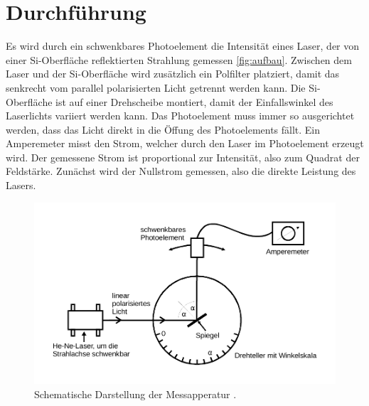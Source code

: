 \section{Durchführung}
\label{sec:Durchführung}

Es wird durch ein schwenkbares Photoelement die Intensität eines Laser, der von einer Si-Oberfläche reflektierten Strahlung gemessen \autoref{fig:aufbau}.
Zwischen dem Laser und der Si-Oberfläche wird zusätzlich ein Polfilter platziert, damit das senkrecht vom parallel polarisierten Licht getrennt werden kann.
Die Si-Oberfläche ist auf einer Drehscheibe montiert, damit der Einfallswinkel des Laserlichts variiert werden kann. Das Photoelement muss immer so ausgerichtet werden, dass das Licht direkt in die Öffung des Photoelements fällt.
Ein Amperemeter misst den Strom, welcher durch den Laser im Photoelement erzeugt wird. Der gemessene Strom ist proportional zur Intensität, also zum Quadrat der Feldstärke.
Zunächst wird der Nullstrom gemessen, also die direkte Leistung des Lasers.

\begin{figure}[H]
    \centering
    \includegraphics{Aufbau.pdf}
    \caption{Schematische Darstellung der Messapperatur \cite{ap01}.}
    \label{fig:aufbau}
\end{figure}
